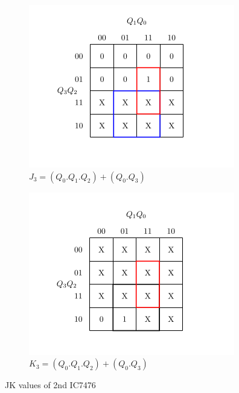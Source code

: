 \documentclass[a4paper,12pt]{article}
\begin{document}
\begin{figure}[H]
    \vspace{0.5cm}

    \begin{subfigure}[b]{0.45\textwidth}
        \centering
        \includegraphics[width=\linewidth]{inc/ij3.png}
        \caption{$J_3=(Q_0.Q_1.Q_2)+(Q_0.Q_3)$}
    \end{subfigure}
    \hfill
    \begin{subfigure}[b]{0.45\textwidth}
        \centering
        \includegraphics[width=\linewidth]{inc/ik3.png}
        \caption{$K_3=(Q_0.Q_1.Q_2)+(Q_0.Q_3)$}
    \end{subfigure}

    \caption{JK values of 2nd IC7476}
\end{figure}
\end{document}
